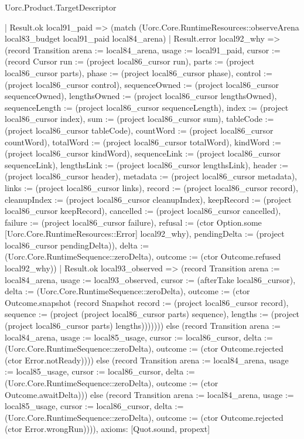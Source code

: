 \begin{lexlean}{Uorc.Product.TargetDescriptor}
\begin{semanticmodule}
{      | Result.ok local91_paid => (match (Uorc.Core.RuntimeResources::observeArena local83_budget local91_paid local84_arena)
        | Result.error local92_why => (record Transition {arena := local84_arena, usage := local91_paid, cursor := (record Cursor {run := (project local86_cursor run), parts := (project local86_cursor parts), phase := (project local86_cursor phase), control := (project local86_cursor control), sequenceOwned := (project local86_cursor sequenceOwned), lengthsOwned := (project local86_cursor lengthsOwned), sequenceLength := (project local86_cursor sequenceLength), index := (project local86_cursor index), sum := (project local86_cursor sum), tableCode := (project local86_cursor tableCode), countWord := (project local86_cursor countWord), totalWord := (project local86_cursor totalWord), kindWord := (project local86_cursor kindWord), sequenceLink := (project local86_cursor sequenceLink), lengthsLink := (project local86_cursor lengthsLink), header := (project local86_cursor header), metadata := (project local86_cursor metadata), links := (project local86_cursor links), record := (project local86_cursor record), cleanupIndex := (project local86_cursor cleanupIndex), keepRecord := (project local86_cursor keepRecord), cancelled := (project local86_cursor cancelled), failure := (project local86_cursor failure), refusal := (ctor Option.some [Uorc.Core.RuntimeResources::Error] local92_why), pendingDelta := (project local86_cursor pendingDelta)}), delta := (Uorc.Core.RuntimeSequence::zeroDelta), outcome := (ctor Outcome.refused local92_why)})
        | Result.ok local93_observed => (record Transition {arena := local84_arena, usage := local93_observed, cursor := (afterTake local86_cursor), delta := (Uorc.Core.RuntimeSequence::zeroDelta), outcome := (ctor Outcome.snapshot (record Snapshot {record := (project local86_cursor record), sequence := (project (project local86_cursor parts) sequence), lengths := (project (project local86_cursor parts) lengths)}))})))) else (record Transition {arena := local84_arena, usage := local85_usage, cursor := local86_cursor, delta := (Uorc.Core.RuntimeSequence::zeroDelta), outcome := (ctor Outcome.rejected (ctor Error.notReady))})) else (record Transition {arena := local84_arena, usage := local85_usage, cursor := local86_cursor, delta := (Uorc.Core.RuntimeSequence::zeroDelta), outcome := (ctor Outcome.awaitDelta)})) else (record Transition {arena := local84_arena, usage := local85_usage, cursor := local86_cursor, delta := (Uorc.Core.RuntimeSequence::zeroDelta), outcome := (ctor Outcome.rejected (ctor Error.wrongRun))})),
  axioms: [Quot.sound, propext]
}


\end{semanticmodule}
\end{lexlean}
